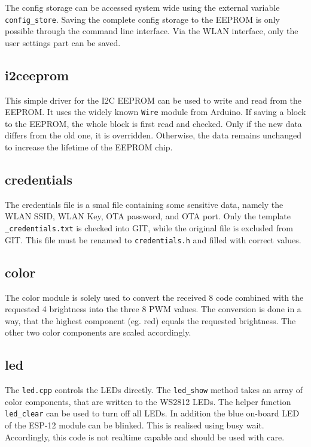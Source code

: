 The config storage can be accessed system wide using the external variable \texttt{config\_store}. Saving the complete config storage to the EEPROM is only possible through the command line interface. Via the WLAN interface, only the user settings part can be saved. 


\subsection{i2ceeprom}
This simple driver for the I2C EEPROM can be used to write and read from the EEPROM. It uses the widely known \texttt{Wire} module from Arduino. If saving a block to the EEPROM, the whole block is first read and checked. Only if the new data differs from the old one, it is overridden. Otherwise, the data remains unchanged to increase the lifetime of the EEPROM chip. 

\subsection{credentials}
The credentials file is a smal file containing some sensitive data, namely the WLAN SSID, WLAN Key, OTA password, and OTA port. Only the template \texttt{\_credentials.txt} is checked into GIT, while the original file is excluded from GIT. This file must be renamed to \texttt{credentials.h} and filled with correct values. 

\subsection{color}
The color module is solely used to convert the received \qty{8}{\bit} code combined with the requested \qty{4}{\bit} brightness into the three \qty{8}{\bit} \ac{PWM} values. 
The conversion is done in a way, that the highest component (eg. red) equals the requested brightness. The other two color components are scaled accordingly. 

\subsection{led}
The \texttt{led.cpp} controls the \acp{LED} directly. The \texttt{led\_show} method takes an array of color components, that are written to the WS2812 \acp{LED}. The helper function \texttt{led\_clear} can be used to turn off all \acp{LED}. In addition the blue on-board \ac{LED} of the ESP-12 module can be blinked. This is realised using busy wait. Accordingly, this code is not realtime capable and should be used with care. 

